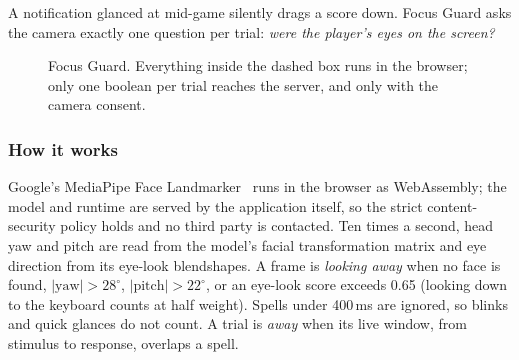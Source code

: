 \documentclass[11pt,a4paper]{article}
\begin{document}
A notification glanced at mid-game silently drags a score down. Focus Guard asks the camera exactly one question per trial: \emph{were the player's eyes on the screen?}

\begin{figure}[h]
\centering
{}
\caption{Focus Guard. Everything inside the dashed box runs in the browser; only one boolean per trial reaches the server, and only with the camera consent.}
\label{fig:focus}
\end{figure}

\subsubsection{How it works} Google's MediaPipe Face Landmarker~\cite{mediapipe} runs in the browser as WebAssembly; the model and runtime are served by the application itself, so the strict content-security policy holds and no third party is contacted. Ten times a second, head yaw and pitch are read from the model's facial transformation matrix and eye direction from its eye-look blendshapes. A frame is \emph{looking away} when no face is found, $|\text{yaw}|>28^\circ$, $|\text{pitch}|>22^\circ$, or an eye-look score exceeds 0.65 (looking down to the keyboard counts at half weight). Spells under 400\,ms are ignored, so blinks and quick glances do not count. A trial is \emph{away} when its live window, from stimulus to response, overlaps a spell.
\end{document}
